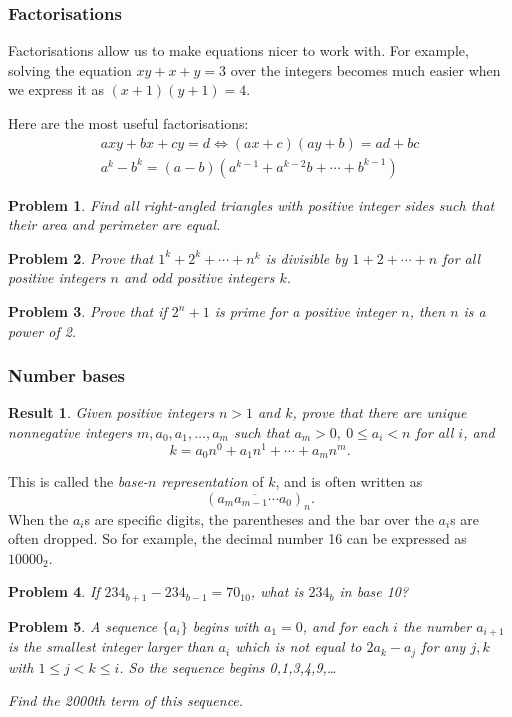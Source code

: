 \documentclass{amsart}
\newtheorem{problem}{Problem}[subsubsection]
\newtheorem{result}{Result}[subsubsection]
\begin{document}
\subsubsection{Factorisations}
Factorisations allow us to make equations nicer to work with. For example,
solving the equation $xy+x+y=3$ over the integers becomes much easier when we
express it as $(x+1)(y+1)=4$.

Here are the most useful factorisations:
\begin{align*}
  axy+bx+cy=d\iff (ax+c)(ay+b)=ad+bc \\
  a^k-b^k=(a-b)\left(a^{k-1}+a^{k-2}b+\cdots+b^{k-1}\right)
\end{align*}
\begin{problem}{\label{p:b:n:f:1}}
     Find all right-angled triangles with positive integer sides 
      such that their area and perimeter are equal.
\end{problem}
\begin{problem}{\label{p:b:n:f:2}}
     Prove that $1^k+2^k+\cdots+n^k$ is divisible by $1+2+\cdots+n$ for
      all positive integers $n$ and odd positive integers $k$.
\end{problem}
\begin{problem}{\label{p:b:n:f:3}}
    Prove that if $2^n+1$ is prime for a positive integer $n$, then $n$ is
      a power of 2.
\end{problem}
\subsubsection{Number bases}\label{b:n:bases}
\begin{result}{\label{r:b:n:b:1}}
    Given positive integers $n>1$ and $k$, prove that there are unique
      nonnegative integers $m,a_0,a_1,\ldots,a_m$ such that $a_m>0,\ 0\le
      a_i<n$ for all $i$, and
      \[k=a_0 n^0+a_1 n^1+\cdots+a_m n^m.\]
\end{result}
This is called the \emph{base-$n$ representation} of $k$, and is often written
as
\[(\overline{a_m a_{m-1}\cdots a_0})_n.\]
When the $a_i$s are specific digits, the parentheses and the bar over the $a_i$s
are often dropped. So for example, the decimal number 16 can be expressed as
$10000_2$.
\begin{problem}{\label{p:b:n:b:1}}
   If $234_{b+1}-234_{b-1}=70_{10}$, what is $234_b$ in base 10?
\end{problem}
\begin{problem}{\label{p:b:n:b:2}}
  A sequence $\{a_i\}$ begins with $a_1=0$, and for each $i$ the number
    $a_{i+1}$ is the smallest integer larger than $a_i$ which is not
    equal to $2a_k-a_j$ for any $j,k$ with $1\le j<k\le i$. So the sequence begins
    0,1,3,4,9,\ldots

    Find the 2000th term of this sequence.
\end{problem}
\end{document}
